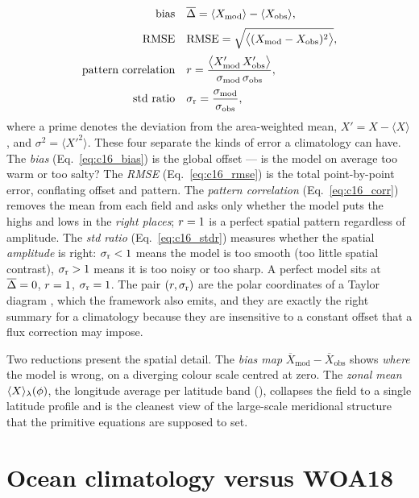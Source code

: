 \begin{align}
  \text{bias} \quad
    &\overline{\Delta} = \langle X_{\mathrm{mod}}\rangle - \langle X_{\mathrm{obs}}\rangle ,
    \label{eq:c16_bias}\\[2pt]
  \text{RMSE} \quad
    &\mathrm{RMSE} = \sqrt{\big\langle (X_{\mathrm{mod}} - X_{\mathrm{obs}})^2 \big\rangle} ,
    \label{eq:c16_rmse}\\[2pt]
  \text{pattern correlation} \quad
    &r = \frac{\big\langle X_{\mathrm{mod}}' \, X_{\mathrm{obs}}' \big\rangle}
                   {\sigma_{\mathrm{mod}}\,\sigma_{\mathrm{obs}}} ,
    \label{eq:c16_corr}\\[2pt]
  \text{std ratio} \quad
    &\sigma_{\mathrm{r}} = \frac{\sigma_{\mathrm{mod}}}{\sigma_{\mathrm{obs}}} ,
    \label{eq:c16_stdr}
\end{align}
%
where a prime denotes the deviation from the area-weighted mean,
$X' = X - \langle X\rangle$, and $\sigma^2 = \langle X'^2\rangle$. These four
separate the kinds of error a climatology can have. The \emph{bias}
(Eq.~\ref{eq:c16_bias}) is the global offset --- is the model on average too warm
or too salty? The \emph{RMSE} (Eq.~\ref{eq:c16_rmse}) is the total point-by-point
error, conflating offset and pattern. The \emph{pattern correlation}
(Eq.~\ref{eq:c16_corr}) removes the mean from each field and asks only whether
the model puts the highs and lows in the \emph{right places}; $r=1$ is a
perfect spatial pattern regardless of amplitude. The \emph{std ratio}
(Eq.~\ref{eq:c16_stdr}) measures whether the spatial \emph{amplitude} is right:
$\sigma_{\mathrm{r}}<1$ means the model is too smooth (too little spatial contrast),
$\sigma_{\mathrm{r}}>1$ means it is too noisy or too sharp. A perfect model sits at
$\overline{\Delta}=0$, $r=1$, $\sigma_{\mathrm{r}}=1$. The pair $(r,\sigma_{\mathrm{r}})$ are the polar
coordinates of a Taylor diagram \citep{taylor2001}, which the framework also
emits, and they are exactly the right summary for a climatology because they are
insensitive to a constant offset that a flux correction may impose.

Two reductions present the spatial detail. The \emph{bias map}
$\overline{X}_{\mathrm{mod}} - \overline{X}_{\mathrm{obs}}$ shows \emph{where}
the model is wrong, on a diverging colour scale centred at zero. The
\emph{zonal mean} $\langle X\rangle_\lambda(\phi)$, the longitude average per
latitude band (), collapses the field to a single
latitude profile and is the cleanest view of the large-scale meridional
structure that the primitive equations are supposed to set.

\section{Ocean climatology versus WOA18}\label{sec:c16_ocean}

